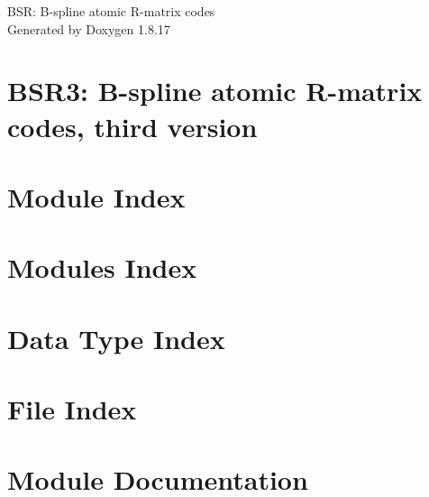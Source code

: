 \let\mypdfximage\pdfximage\def\pdfximage{\immediate\mypdfximage}\documentclass[twoside]{book}
\newcommand{\+}{\discretionary{\mbox{\scriptsize$\hookleftarrow$}}{}{}}
\newcommand{\clearemptydoublepage}{%
  \newpage{\pagestyle{empty}\cleardoublepage}%
}
\begin{document}
\hypersetup{pageanchor=false,
             bookmarksnumbered=true,
             pdfencoding=unicode
            }
\begin{titlepage}
\vspace*{7cm}
\begin{center}%
{\Large B\+SR\+: B-\/spline atomic R-\/matrix codes }\\
\vspace*{1cm}
{\large Generated by Doxygen 1.8.17}\\
\end{center}
\end{titlepage}
\clearemptydoublepage
{}
\tableofcontents
\clearemptydoublepage
{}
\hypersetup{pageanchor=true}

\chapter{B\+S\+R3\+: B-\/spline atomic R-\/matrix codes, third version}
\label{index}\hypertarget{index}{}
\chapter{Module Index}

\chapter{Modules Index}

\chapter{Data Type Index}

\chapter{File Index}

\chapter{Module Documentation}








\end{document}
